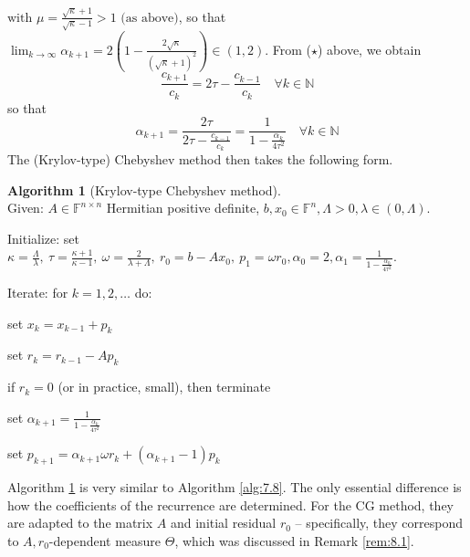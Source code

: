 \documentclass[12pt]{article}
\theoremstyle{definition}
\newtheorem{algorithm}[theorem]{Algorithm}
\theoremstyle{remark}
\numberwithin{equation}{section}
\newcommand{\F}{\mathbb{F}}
\newcommand{\N}{\mathbb{N}}
\begin{document}
\begin{enumerate}[label=(\roman*)]
\begin{multline*}
      \end{multline*}
      $\text{with } \mu = \frac{\sqrt{\kappa}+1}{\sqrt{\kappa}-1} > 1 \text{ (as above)}$, so that $\lim_{k \rightarrow \infty} \alpha_{k+1} = 2\left(1 - \frac{2 \sqrt{\kappa}}{(\sqrt{\kappa}+1)^2}\right) \in (1,2)$.
      From ($\star$) above, we obtain
      \begin{equation*}
        \frac{c_{k+1}}{c_k} = 2 \tau - \frac{c_{k-1}}{c_k} \quad \forall k \in \N
      \end{equation*}
      so that
      \begin{equation*}
        \alpha_{k+1} = \frac{2 \tau}{2 \tau - \frac{c_{k-1}}{c_k}} = \frac{1}{1 - \frac{\alpha_k}{4 \tau^2}} \quad \forall k \in \N
      \end{equation*}
      The (Krylov-type) Chebyshev method then takes the following form.
      \begin{algorithm}[Krylov-type Chebyshev method]~\\[\parskip]
        \label{alg:9.5}
        Given: $A \in \F^{n\times n}$ Hermitian positive definite, $b, x_0 \in \F^n, \Lambda > 0, \lambda \in (0,\Lambda)$.

        Initialize: set $\kappa = \frac{\Lambda}{\lambda},\ \tau = \frac{\kappa + 1}{\kappa - 1},\ \omega = \frac{2}{\lambda + \Lambda},\ r_0 = b- Ax_0,\ p_1 = \omega r_0, \alpha_0 = 2, \alpha_1 = \frac{1}{1 - \frac{\alpha_0}{4 \tau^2}}$.

        Iterate: for $k = 1,2,\ldots$ do:

        \hspace{2em} set $x_k = x_{k-1} + p_k$

        \hspace{2em} set $r_k = r_{k-1} - A p_k$

        \hspace{2em} if $r_k = 0$ (or in practice, small), then terminate

        \hspace{2em} set $\alpha_{k+1} = \frac{1}{1 - \frac{\alpha_k}{4 \tau^2}}$

        \hspace{2em} set $p_{k+1} = \alpha_{k+1} \omega r_k + (\alpha_{k+1} - 1) p_k$
      \end{algorithm}
  \end{enumerate}
  Algorithm \ref{alg:9.5} is very similar to Algorithm \ref{alg:7.8}. The only essential difference is how the coefficients of the recurrence are determined. For the CG method, they are adapted to the matrix $A$ and initial residual $r_0$ -- specifically, they correspond to $A,r_0$-dependent measure $\Theta$, which was discussed in Remark \ref{rem:8.1}.
\end{document}
